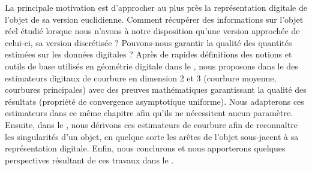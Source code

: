 La principale motivation est d'approcher au plus près la représentation digitale
de l'objet de sa version euclidienne. Comment récupérer des informations sur
l'objet réel étudié lorsque nous n'avons à notre disposition qu'une version
approchée de celui-ci, sa version discrétisée ? Pouvons-nous garantir la qualité
des quantités estimées sur les données digitales ? Après de rapides définitions
des notions et outils de base utilisés en géométrie digitale dans le
, nous proposons dans le 
des estimateurs digitaux de courbure en dimension 2 et 3 (courbure moyenne,
courbures principales) avec des preuves mathématiques garantissant la qualité
des résultats (propriété de convergence asymptotique uniforme). Nous adapterons
ces estimateurs dans ce même chapitre afin qu'ils ne nécessitent aucun
paramètre. Ensuite, dans le , nous dérivons ces
estimateurs de courbure afin de reconnaître les singularités d'un objet, en
quelque sorte les arêtes de l'objet sous-jacent à sa représentation digitale.
Enfin, nous conclurons et nous apporterons quelques perspectives résultant de
ces travaux dans le .
%
%
%
%
%
%
%
